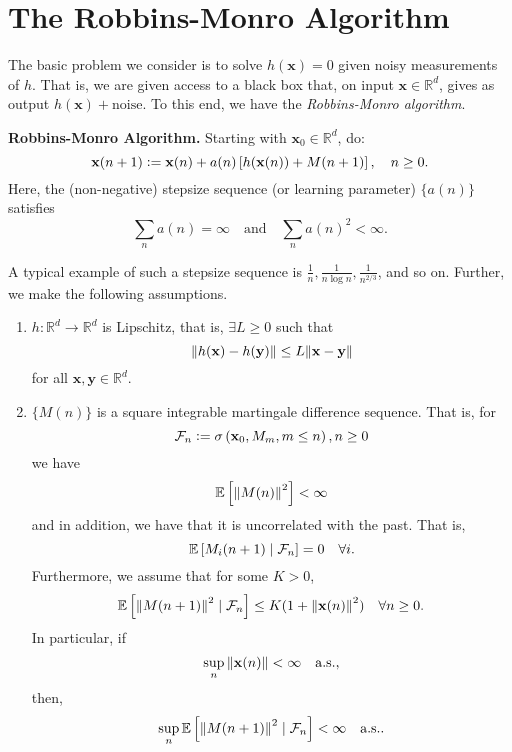 \section{The Robbins-Monro Algorithm}

The basic problem we consider is to solve $h(\mathbf{x}) = 0$ given noisy measurements of $h$. That is, we are given access to a black box that, on input $\mathbf{x} \in \mathbb{R}^d$, gives as output $h(\mathbf{x}) + \text{noise}$. To this end, we have the \textit{Robbins-Monro algorithm}.

\medskip

\textbf{Robbins-Monro Algorithm.} Starting with $\mathbf{x}_0 \in \mathbb{R}^d$, do: 
\[  
    \mathbf{x}(n+1) \vcentcolon= \mathbf{x}(n) + a(n) \left[ h(\mathbf{x}(n)) + M(n+1) \right], \quad n \geq 0.
\]  
Here, the (non-negative) stepsize sequence (or learning parameter) $\{a(n)\}$ satisfies
\[
    \sum_{n} a(n) = \infty \quad \text{and} \quad \sum_{n} a(n)^2 < \infty. 
\]

A typical example of such a stepsize sequence is $\frac{1}{n}, \frac{1}{n\log n}, \frac{1}{n^{2/3}}$, and so on. Further, we make the following assumptions. 

\begin{enumerate}
    \item $h \colon \mathbb{R}^d \to \mathbb{R}^d$ is Lipschitz, that is, $\exists L \geq 0$ such that
    \[
        \norm{h(\mathbf{x}) - h(\mathbf{y})} \leq L\norm{\mathbf{x} - \mathbf{y}}
    \]
    for all $\mathbf{x,y} \in \mathbb{R}^d$. 
    
    \item $\{M(n)\}$ is a square integrable martingale difference sequence. That is, for 
    \[
        \mathcal{F}_n \vcentcolon= \sigma \left( \mathbf{x}_0, M_m, m \leq n \right), n \geq 0
    \]
    we have
    \[
        \mathbb{E} \left[ \norm{M(n)}^2 \right] < \infty
    \]
    and in addition, we have that it is uncorrelated with the past. That is, 
    \[
        \mathbb{E} \left[ M_i(n+1) \mid \mathcal{F}_n \right] = 0 \quad \forall i.
    \]
    Furthermore, we assume that for some $K > 0$, 
    \[
        \mathbb{E} \left[ \norm{M(n+1)}^2 \mid \mathcal{F}_n \right] \leq K(1 + \norm{\mathbf{x}(n)}^2) \quad \forall n \geq 0.
    \]
    In particular, if 
    \[
        \sup_n \norm{\mathbf{x}(n)} < \infty \quad \text{a.s.}, 
    \]
    then,
    \[
        \sup_n \mathbb{E} \left[ \norm{M(n+1)}^2 \mid \mathcal{F}_n \right] < \infty \quad \text{a.s.}.
    \]
\end{enumerate}

